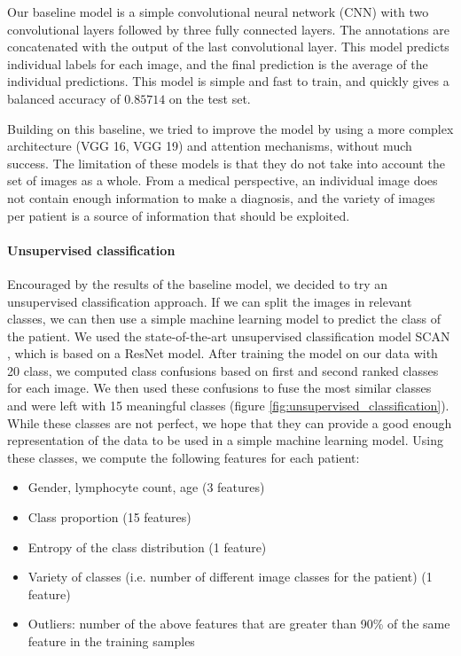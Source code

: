 \documentclass{midl}
\begin{document}
Our baseline model is a simple convolutional neural network (CNN) with two convolutional layers followed by three fully connected layers. The annotations are concatenated with the output of the last convolutional layer. This model predicts individual labels for each image, and the final prediction is the average of the individual predictions. This model is simple and fast to train, and quickly gives a balanced accuracy of $0.85714$ on the test set.

Building on this baseline, we tried to improve the model by using a more complex architecture (VGG 16, VGG 19) and attention mechanisms, without much success. The limitation of these models is that they do not take into account the set of images as a whole. From a medical perspective, an individual image does not contain enough information to make a diagnosis, and the variety of images per patient is a source of information that should be exploited.

\paragraph*{Unsupervised classification}

Encouraged by the results of the baseline model, we decided to try an unsupervised classification approach. If we can split the images in relevant classes, we can then use a simple machine learning model to predict the class of the patient. We used the state-of-the-art unsupervised classification model SCAN \cite{van-gansbeke-2020}, which is based on a ResNet model. After training the model on our data with 20 class, we computed class confusions based on first and second ranked classes for each image. We then used these confusions to fuse the most similar classes and were left with 15 meaningful classes (figure \ref{fig:unsupervised_classification}). While these classes are not perfect, we hope that they can provide a good enough representation of the data to be used in a simple machine learning model. Using these classes, we compute the following features for each patient:

\begin{itemize}
    \setlength\itemsep{0em}
    \item Gender, lymphocyte count, age (3 features)
    \item Class proportion (15 features)
    \item Entropy of the class distribution (1 feature)
    \item Variety of classes (i.e. number of different image classes for the patient) (1 feature)
    \item Outliers: number of the above features that are greater than 90\% of the same feature in the training samples
\end{itemize}
\end{document}
